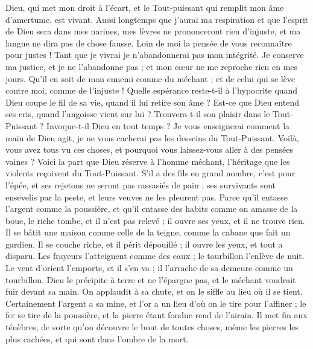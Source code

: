 \begin{multicols}{2}
Dieu, qui met mon droit à l'écart, et le Tout-puissant qui remplit mon âme d'amertume, est vivant.
Aussi longtemps que j'aurai ma respiration et que l'esprit de Dieu sera dans mes narines,
mes lèvres ne prononceront rien d'injuste, et ma langue ne dira pas de chose fausse.
Loin de moi la pensée de vous reconnaître pour justes ! Tant que je vivrai je n'abandonnerai pas mon intégrité.
Je conserve ma justice, et je ne l'abandonne pas ; et mon cœur ne me reproche rien en mes jours.
Qu'il en soit de mon ennemi comme du méchant ; et de celui qui se lève contre moi, comme de l'injuste !
Quelle espérance reste-t-il à l'hypocrite quand Dieu coupe le fil de sa vie, quand il lui retire son âme ?
Est-ce que Dieu entend ses cris, quand l'angoisse vient sur lui ?
Trouvera-t-il son plaisir dans le Tout-Puissant ? Invoque-t-il Dieu en tout temps ?
Je vous enseignerai comment la main de Dieu agit, je ne vous cacherai pas les desseins du Tout-Puissant.
Voilà, vous avez tous vu ces choses, et pourquoi vous laissez-vous aller à des pensées vaines ?
Voici la part que Dieu réserve à l'homme méchant, l'héritage que les violents reçoivent du Tout-Puissant.
S'il a des fils en grand nombre, c'est pour l'épée, et ses rejetons ne seront pas rassasiés de pain ;
ses survivants sont ensevelis par la peste, et leurs veuves ne les pleurent pas.
Parce qu’il entasse l'argent comme la poussière, et qu'il entasse des habits comme on amasse de la boue,
le riche tombe, et il n’est pas relevé ; il ouvre ses yeux, et il ne trouve rien.
Il se bâtit une maison comme celle de la teigne, comme la cabane que fait un gardien.
Il se couche riche, et il périt dépouillé ; il ouvre les yeux, et tout a disparu.
Les frayeurs l'atteignent comme des eaux ; le tourbillon l'enlève de nuit.
Le vent d'orient l'emporte, et il s'en va ; il l'arrache de sa demeure comme un tourbillon.
Dieu le précipite à terre et ne l'épargne pas, et le méchant voudrait fuir devant sa main.
On applaudit à sa chute, et on le siffle au lieu où il se tient.
\VerseOne{}Certainement l'argent a sa mine, et l'or a un lieu d'où on le tire pour l'affiner ;
le fer se tire de la poussière, et la pierre étant fondue rend de l'airain.
Il met fin aux ténèbres, de sorte qu'on découvre le bout de toutes choses, même les pierres les plus cachées, et qui sont dans l'ombre de la mort.

\end{multicols}
